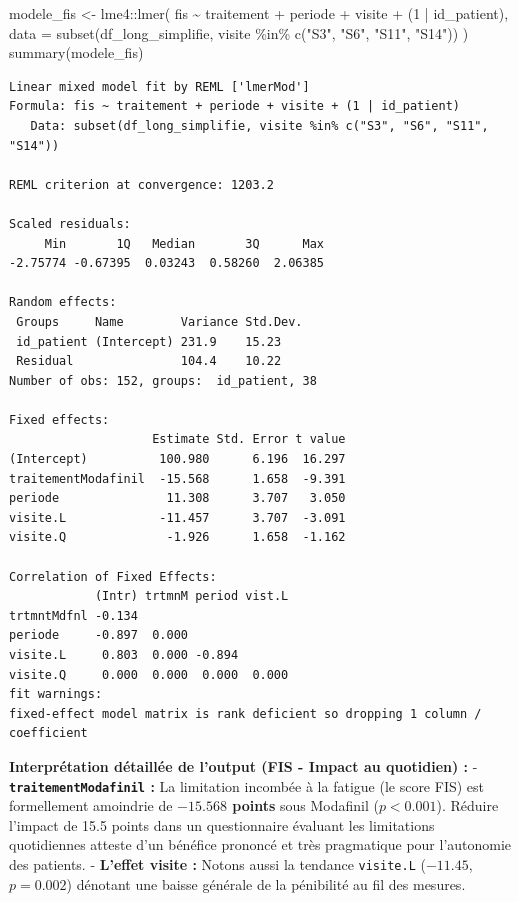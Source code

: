 \documentclass[
  letterpaper,
  DIV=11,
  numbers=noendperiod]{scrartcl}
\newenvironment{Shaded}{\begin{snugshade}}{\end{snugshade}}
\newcommand{\AttributeTok}[1]{\textcolor[rgb]{0.40,0.45,0.13}{#1}}
\newcommand{\DecValTok}[1]{\textcolor[rgb]{0.68,0.00,0.00}{#1}}
\newcommand{\FunctionTok}[1]{\textcolor[rgb]{0.28,0.35,0.67}{#1}}
\newcommand{\NormalTok}[1]{\textcolor[rgb]{0.00,0.23,0.31}{#1}}
\newcommand{\OtherTok}[1]{\textcolor[rgb]{0.00,0.23,0.31}{#1}}
\newcommand{\SpecialCharTok}[1]{\textcolor[rgb]{0.37,0.37,0.37}{#1}}
\newcommand{\StringTok}[1]{\textcolor[rgb]{0.13,0.47,0.30}{#1}}
\begin{document}
\begin{Shaded}
\begin{Highlighting}[]
\NormalTok{modele\_fis }\OtherTok{\textless{}{-}}\NormalTok{ lme4}\SpecialCharTok{::}\FunctionTok{lmer}\NormalTok{(}
\NormalTok{  fis }\SpecialCharTok{\textasciitilde{}}\NormalTok{ traitement }\SpecialCharTok{+}\NormalTok{ periode }\SpecialCharTok{+}\NormalTok{ visite }\SpecialCharTok{+}\NormalTok{ (}\DecValTok{1} \SpecialCharTok{|}\NormalTok{ id\_patient),}
  \AttributeTok{data =} \FunctionTok{subset}\NormalTok{(df\_long\_simplifie, visite }\SpecialCharTok{\%in\%} \FunctionTok{c}\NormalTok{(}\StringTok{"S3"}\NormalTok{, }\StringTok{"S6"}\NormalTok{, }\StringTok{"S11"}\NormalTok{, }\StringTok{"S14"}\NormalTok{))}
\NormalTok{)}
\FunctionTok{summary}\NormalTok{(modele\_fis)}
\end{Highlighting}
\end{Shaded}

\begin{verbatim}
Linear mixed model fit by REML ['lmerMod']
Formula: fis ~ traitement + periode + visite + (1 | id_patient)
   Data: subset(df_long_simplifie, visite %in% c("S3", "S6", "S11", "S14"))

REML criterion at convergence: 1203.2

Scaled residuals: 
     Min       1Q   Median       3Q      Max 
-2.75774 -0.67395  0.03243  0.58260  2.06385 

Random effects:
 Groups     Name        Variance Std.Dev.
 id_patient (Intercept) 231.9    15.23   
 Residual               104.4    10.22   
Number of obs: 152, groups:  id_patient, 38

Fixed effects:
                    Estimate Std. Error t value
(Intercept)          100.980      6.196  16.297
traitementModafinil  -15.568      1.658  -9.391
periode               11.308      3.707   3.050
visite.L             -11.457      3.707  -3.091
visite.Q              -1.926      1.658  -1.162

Correlation of Fixed Effects:
            (Intr) trtmnM period vist.L
trtmntMdfnl -0.134                     
periode     -0.897  0.000              
visite.L     0.803  0.000 -0.894       
visite.Q     0.000  0.000  0.000  0.000
fit warnings:
fixed-effect model matrix is rank deficient so dropping 1 column / coefficient
\end{verbatim}

\textbf{Interprétation détaillée de l'output (FIS - Impact au quotidien)
:} - \textbf{\texttt{traitementModafinil} :} La limitation incombée à la
fatigue (le score FIS) est formellement amoindrie de \textbf{\(-15.568\)
points} sous Modafinil (\(p < 0.001\)). Réduire l'impact de 15.5 points
dans un questionnaire évaluant les limitations quotidiennes atteste d'un
bénéfice prononcé et très pragmatique pour l'autonomie des patients. -
\textbf{L'effet visite :} Notons aussi la tendance \texttt{visite.L}
(\(-11.45\), \(p=0.002\)) dénotant une baisse générale de la pénibilité
au fil des mesures.
\end{document}
